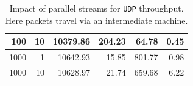 \documentclass[12pt,a4paper,twoside,openright]{report}
\begin{document}
\begin{table}[H]
\begin{tabular}{|r|r|r|r|r|r|}
100                                                                                             & 10                                                                                                                      & 10379.86                                                                                                                                   & 204.23                                                                                                                               & 64.78                                                                                                 & 0.45                                                                                                                               \\ \hline
1000                                                                                            & 1                                                                                                                       & 10642.93                                                                                                                                   & 15.85                                                                                                                                & 801.77                                                                                                & 0.98                                                                                                                               \\ \hline
1000                                                                                            & 10                                                                                                                      & 10628.97                                                                                                                                   & 21.74                                                                                                                                & 659.68                                                                                                & 6.22                                                                                                                               \\ \hline
\end{tabular}
    \centering
    \caption[Impact of parallel streams for \texttt{UDP} throughput]{Impact of parallel streams for \texttt{UDP} throughput. Here packets travel via an intermediate machine.}
    \label{fig:UDP_throughput_via_B_using_parallel_streams}
\end{table}
\end{document}
